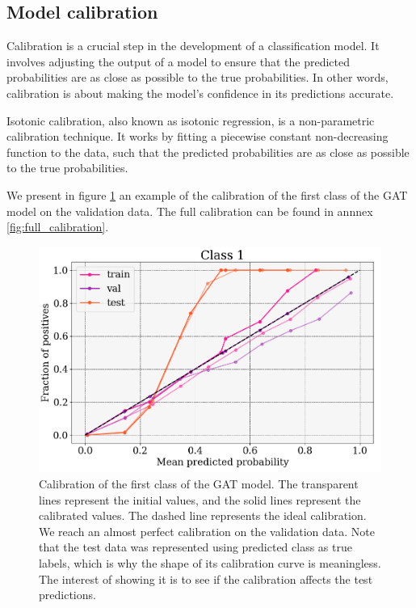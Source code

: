 \documentclass[switch, 11pt]{article}
\begin{document}
\begin{multicols}{2}
    \subsection{Model calibration}

    Calibration is a crucial step in the development of a classification model. It involves adjusting the output of a model to ensure that the predicted probabilities are as close as possible to the true probabilities. In other words, calibration is about making the model's confidence in its predictions accurate.

    Isotonic calibration, also known as isotonic regression, is a non-parametric calibration technique. It works by fitting a piecewise constant non-decreasing function to the data, such that the predicted probabilities are as close as possible to the true probabilities.

    We present in figure \ref{fig:calibration} an example of the calibration of the first class of the GAT model on the validation data. The full calibration can be found in annnex \ref{fig:full_calibration}.

    \begin{figure}[H]
        \centering
        \includegraphics[width=\columnwidth]{figures/small_calibration.png}
        \caption{Calibration of the first class of the GAT model. The transparent lines represent the initial values, and the solid lines represent the calibrated values. The dashed line represents the ideal calibration. We reach an almost perfect calibration on the validation data. Note that the test data was represented using predicted class as true labels, which is why the shape of its calibration curve is meaningless. The interest of showing it is to see if the calibration affects the test predictions.}
        \label{fig:calibration}
    \end{figure}


\end{multicols}
\end{document}
